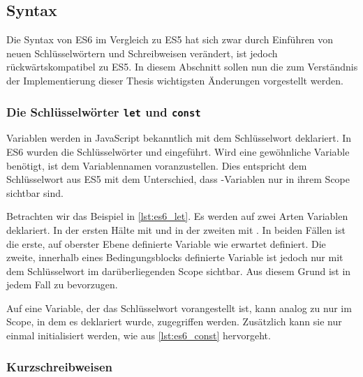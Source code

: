 \subsection{Syntax}
\label{ssec:ge_syntax}

Die Syntax von ES6 im Vergleich zu ES5 hat sich zwar durch Einführen von neuen
Schlüsselwörtern und Schreibweisen verändert, ist jedoch rückwärtskompatibel zu
ES5.  In diesem Abschnitt sollen nun die zum Verständnis der Implementierung
dieser Thesis wichtigsten Änderungen vorgestellt werden.

\subsubsection{Die Schlüsselwörter \texttt{let} und \texttt{const}}
\label{sssec:ges_let_und_const}

Variablen werden in JavaScript bekanntlich mit dem Schlüsselwort 
deklariert.  In ES6 wurden die Schlüsselwörter  und 
eingeführt.  Wird eine gewöhnliche Variable benötigt, ist  dem
Variablennamen voranzustellen.  Dies entspricht dem Schlüsselwort  aus
ES5 mit dem Unterschied, dass -Variablen nur in ihrem Scope sichtbar
sind.

Betrachten wir das Beispiel in \cref{lst:es6_let}.  Es werden auf zwei Arten
Variablen deklariert.  In der ersten Hälte mit  und in der zweiten mit
.  In beiden Fällen ist die erste, auf oberster Ebene definierte
Variable wie erwartet definiert.  Die zweite, innerhalb eines Bedingungsblocks
definierte Variable ist jedoch nur mit dem Schlüsselwort  im
darüberliegenden Scope sichtbar.  Aus diesem Grund ist   in
jedem Fall zu bevorzugen.



Auf eine Variable, der das Schlüsselwort  vorangestellt ist, kann
analog zu  nur im Scope, in dem es deklariert wurde, zugegriffen
werden.  Zusätzlich kann sie nur einmal initialisiert werden, wie aus
\cref{lst:es6_const} hervorgeht.



\subsubsection{Kurzschreibweisen}
\label{sssec:ges_kurzschreibweisen}

